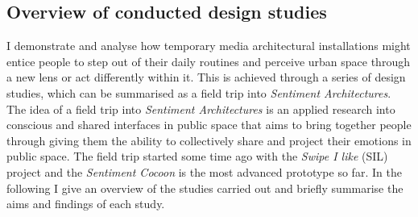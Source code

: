 \subsection*{Overview of conducted design studies}

I demonstrate and analyse how temporary media architectural installations might entice people to step out of their daily routines and perceive urban space through a new lens or act differently within it.
This is achieved through a series of design studies, which can be summarised as a field trip into \textit{Sentiment Architectures}. 
The idea of a field trip into \textit{Sentiment Architectures} is an applied research into conscious and shared interfaces in public space that aims to bring together people through giving them the ability to collectively share and project their emotions in public space. The field trip started some time ago with the \textit{Swipe I like} (SIL) project and the \textit{Sentiment Cocoon} is the most advanced prototype so far. In the following I give an overview of the studies carried out and briefly summarise the aims and findings of each study.


\begin{table}[h!]
\centering
{}
\caption[Overview of conducted design studies]{Overview of conducted design studies including the types of electronic surfaces.}
\label{study_overview}
\end{table}


